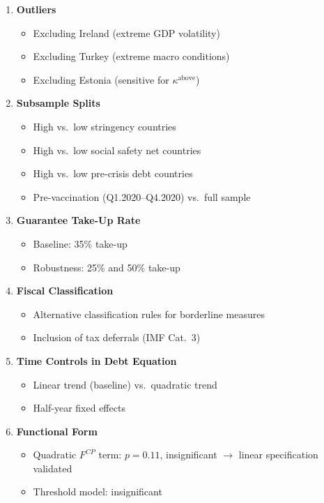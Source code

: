 \documentclass[12pt, a4paper]{article}
\begin{document}
\begin{enumerate}[resume]
\item \textbf{Outliers}
\begin{itemize}
    \item Excluding Ireland (extreme GDP volatility)
    \item Excluding Turkey (extreme macro conditions)
    \item Excluding Estonia (sensitive for $\kappa^{\text{above}}$)
\end{itemize}

\item \textbf{Subsample Splits}
\begin{itemize}
    \item High vs.\ low stringency countries
    \item High vs.\ low social safety net countries
    \item High vs.\ low pre-crisis debt countries
    \item Pre-vaccination (Q1.2020--Q4.2020) vs.\ full sample
\end{itemize}

\item \textbf{Guarantee Take-Up Rate}
\begin{itemize}
    \item Baseline: 35\% take-up
    \item Robustness: 25\% and 50\% take-up
\end{itemize}

\item \textbf{Fiscal Classification}
\begin{itemize}
    \item Alternative classification rules for borderline measures
    \item Inclusion of tax deferrals (IMF Cat.\ 3)
\end{itemize}

\item \textbf{Time Controls in Debt Equation}
\begin{itemize}
    \item Linear trend (baseline) vs.\ quadratic trend
    \item Half-year fixed effects
\end{itemize}

\item \textbf{Functional Form}
\begin{itemize}
    \item Quadratic $F^{CP}$ term: $p = 0.11$, insignificant $\to$
        linear specification validated
    \item Threshold model: insignificant
\end{itemize}

\end{enumerate}
\end{document}
